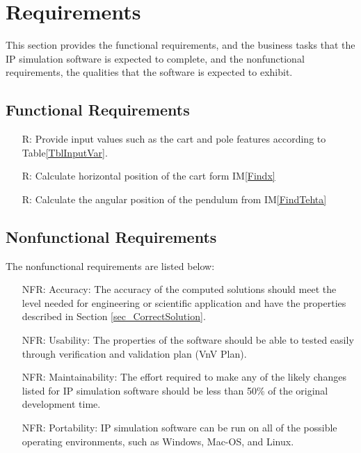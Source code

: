 \documentclass[12pt]{article}
\newcommand{\iref}[1]{IM\ref{#1}}
\newcounter{reqnum} %
\newcounter{nfrnum} %
\begin{document}
\section{Requirements}

This section provides the functional requirements, and the business tasks that the
IP simulation software is expected to complete, and the nonfunctional requirements, the qualities that the software is expected to exhibit.

\subsection{Functional Requirements}

\noindent \begin{itemize}

\item[R\refstepcounter{reqnum}\thereqnum \label{R_Inputs}:] 
{Provide input values such as the cart and pole features according to Table\ref{TblInputVar}.}

\item[R\refstepcounter{reqnum}\thereqnum \label{R_OutputInputs}:] {Calculate horizontal position of the cart form \iref{Findx}}

\item[R\refstepcounter{reqnum}\thereqnum \label{R_Calculate}:] {Calculate the angular position of the pendulum from \iref{FindTehta}}

\end{itemize}

\subsection{Nonfunctional Requirements}
The nonfunctional requirements are listed below:
\noindent \begin{itemize}

\item[NFR\refstepcounter{nfrnum}\thenfrnum \label{NFR_Accuracy}:]
  {Accuracy: The accuracy of the computed solutions should meet the level needed for engineering or scientific application and have the properties described in Section \ref{sec_CorrectSolution}.}
 
\item[NFR\refstepcounter{nfrnum}\thenfrnum \label{NFR_Usability}:] 
{Usability: The properties of the software should be able to tested easily through verification and validation plan (VnV Plan).}
 

\item[NFR\refstepcounter{nfrnum}\thenfrnum \label{NFR_Maintainability}:]
{Maintainability: The effort required to make any of the likely    changes listed for IP simulation software should be less than 50\% of the original development time.}

\item[NFR\refstepcounter{nfrnum}\thenfrnum \label{NFR_Portability}:]
{Portability:  IP simulation software can be run on all of the
    possible operating environments, such as Windows, Mac-OS, and Linux.} 
\end{itemize}
\end{document}
